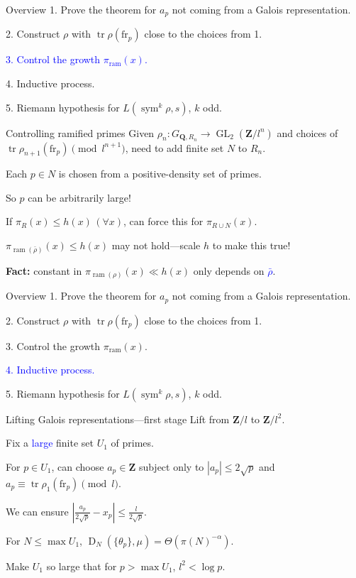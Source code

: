 \documentclass{beamer}
\DeclareMathOperator{\D}{D}
\DeclareMathOperator{\GL}{GL}
\DeclareMathOperator{\ram}{ram}
\DeclareMathOperator{\sym}{sym}
\DeclareMathOperator{\tr}{tr}
\newcommand{\bQ}{\mathbf{Q}}
\newcommand{\bZ}{\mathbf{Z}}
\newcommand{\frob}{\mathrm{fr}}
\begin{document}
\begin{frame}{Overview}
\color{gray}
1. Prove the theorem for $a_p$ not coming from a Galois representation.

2. Construct $\rho$ with $\tr\rho(\frob_p)$ close to the choices from 1.

\textcolor{blue}{
3. Control the growth $\pi_{\ram}(x)$.}

4. Inductive process.

5. Riemann hypothesis for $L(\sym^k\rho,s)$, $k$ odd.
\end{frame}



\begin{frame}{Controlling ramified primes}
Given $\rho_n\colon G_{\bQ,R_n} \to \GL_2(\bZ/l^n)$ and choices of 
$\tr \rho_{n+1}(\frob_p)\pmod{l^{n+1}}$, need to add finite set $N$ to 
$R_n$. 
\pause

Each $p\in N$ is chosen from a positive-density set of primes.
\pause

So $p$ can be arbitrarily large!
\pause

If $\pi_R(x) \leqslant h(x)\,(\forall x)$, can force this for 
$\pi_{R\cup N}(x)$. 
\pause

$\pi_{\ram(\bar\rho)}(x)\leqslant h(x)$ may not hold---scale $h$ to make this 
true!
\pause

\textbf{Fact:} constant in $\pi_{\ram(\rho)}(x) \ll h(x)$ only depends on 
\textcolor{blue}{$\bar\rho$}. 
\end{frame}



\begin{frame}{Overview}
\color{gray}
1. Prove the theorem for $a_p$ not coming from a Galois representation.

2. Construct $\rho$ with $\tr\rho(\frob_p)$ close to the choices from 1.

3. Control the growth $\pi_{\ram}(x)$. 

\textcolor{blue}{
4. Inductive process.}

5. Riemann hypothesis for $L(\sym^k\rho,s)$, $k$ odd.
\end{frame}



\begin{frame}{Lifting Galois representations---first stage}
Lift from $\bZ/l$ to $\bZ/l^2$. 
\pause

Fix a \textcolor{blue}{large} finite set $U_1$ of primes. 
\pause

For $p\in U_1$, can choose $a_p\in \bZ$ subject only to 
$|a_p|\leqslant 2\sqrt p$ and $a_p\equiv \tr\rho_1(\frob_p)\pmod{l}$. 
\pause

We can ensure 
$\left| \frac{a_p}{2\sqrt p} - x_p\right| \leqslant \frac{l}{2\sqrt p}$.
\pause

For $N\leqslant \max U_1$, $\D_N(\{\theta_p\},\mu) = \Theta(\pi(N)^{-\alpha})$. 
\pause

Make $U_1$ so large that for $p>\max U_1$, $l^2 < \log p$. 
\end{frame}
\end{document}
